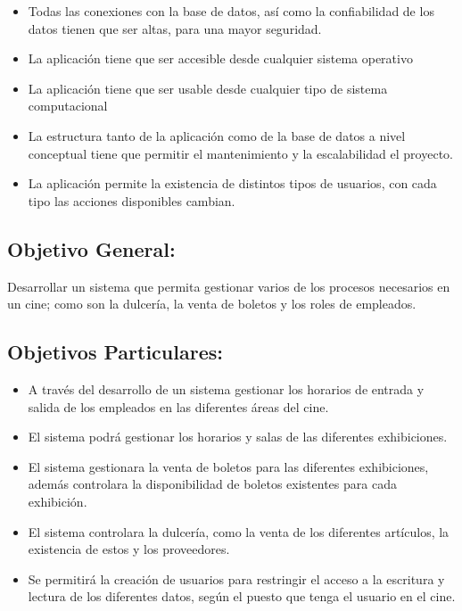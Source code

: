\documentclass[12pt, fleqn]{article}                             %
\begin{document}
    \begin{itemize}
        \item Todas las conexiones con la base de datos, así como la confiabilidad de los datos
            tienen que ser altas, para una mayor seguridad.

        \item La aplicación tiene que ser accesible desde cualquier sistema operativo

        \item La aplicación tiene que ser usable desde cualquier tipo de sistema computacional

        \item La estructura tanto de la aplicación como de la base de datos a nivel conceptual tiene
            que permitir el mantenimiento y la escalabilidad el proyecto.

        \item La aplicación permite la existencia de distintos tipos de usuarios, con cada tipo
            las acciones disponibles cambian.
    \end{itemize}



    \subsection{Objetivo General:}

        Desarrollar un sistema que permita gestionar varios de los procesos necesarios en un cine;
        como son la dulcería, la venta de boletos y los roles de empleados.


    \subsection{Objetivos Particulares:}
    
        \begin{itemize}
            \item A través del desarrollo de un sistema gestionar los horarios de entrada y
                salida de los empleados en las diferentes áreas del cine.
            
            \item El sistema podrá gestionar los horarios y salas de las diferentes exhibiciones.

            \item El sistema gestionara la venta de boletos para las diferentes exhibiciones,
                además controlara la disponibilidad de boletos existentes para cada exhibición.

            \item El sistema controlara la dulcería, como la venta de los diferentes artículos,
                la existencia de estos y los proveedores.

            \item Se permitirá la creación de usuarios para restringir el acceso a la escritura y
                lectura de los diferentes datos, según el puesto que tenga el usuario en el cine.

        \end{itemize}
\end{document}
